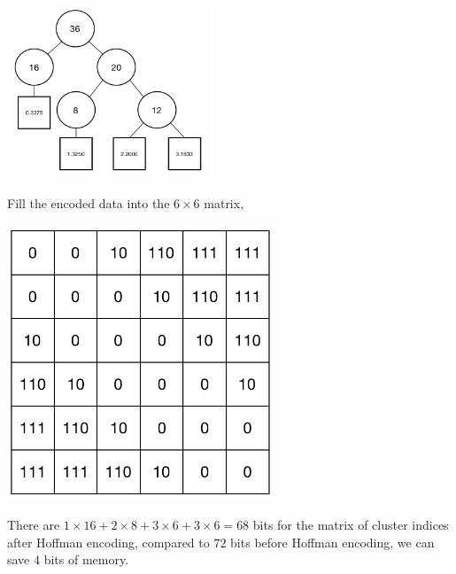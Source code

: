 \documentclass[11pt]{article}
\begin{document}
\begin{solution}
\begin{center}
\end{center}
\begin{center}
\includegraphics[width=6cm]{2_3_2.png}
\end{center}
Fill the encoded data into the $6 \times 6$ matrix,
\begin{center}
\includegraphics[width=8cm]{2_3_3.png}
\end{center}
There are $1 \times 16 + 2 \times 8 + 3 \times 6 + 3 \times 6 = 68$ bits for the matrix of cluster indices after Hoffman encoding, compared to $72$ bits before Hoffman encoding, we can save $4$ bits of memory.
\end{solution}
\setcounter{page}{6}
\end{document}
